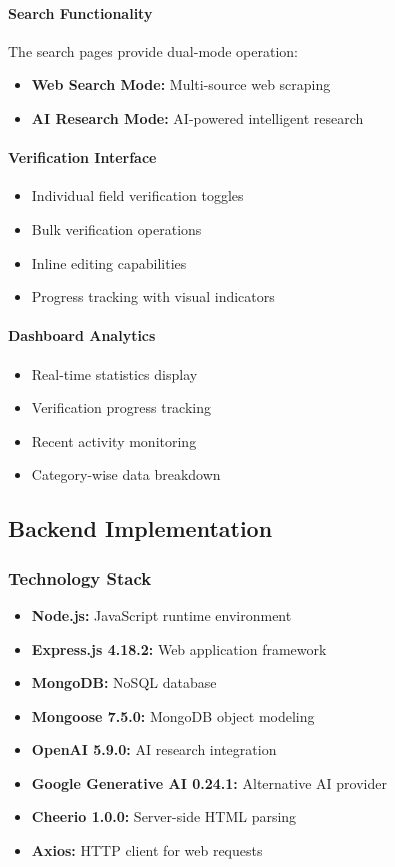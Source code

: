 \documentclass[12pt,a4paper]{article}
\begin{document}
\paragraph{Search Functionality}
The search pages provide dual-mode operation:
\begin{itemize}
    \item \textbf{Web Search Mode:} Multi-source web scraping
    \item \textbf{AI Research Mode:} AI-powered intelligent research
\end{itemize}

\paragraph{Verification Interface}
\begin{itemize}
    \item Individual field verification toggles
    \item Bulk verification operations
    \item Inline editing capabilities
    \item Progress tracking with visual indicators
\end{itemize}

\paragraph{Dashboard Analytics}
\begin{itemize}
    \item Real-time statistics display
    \item Verification progress tracking
    \item Recent activity monitoring
    \item Category-wise data breakdown
\end{itemize}

\subsection{Backend Implementation}

\subsubsection{Technology Stack}
\begin{itemize}
    \item \textbf{Node.js:} JavaScript runtime environment
    \item \textbf{Express.js 4.18.2:} Web application framework
    \item \textbf{MongoDB:} NoSQL database
    \item \textbf{Mongoose 7.5.0:} MongoDB object modeling
    \item \textbf{OpenAI 5.9.0:} AI research integration
    \item \textbf{Google Generative AI 0.24.1:} Alternative AI provider
    \item \textbf{Cheerio 1.0.0:} Server-side HTML parsing
    \item \textbf{Axios:} HTTP client for web requests
\end{itemize}
\end{document}
